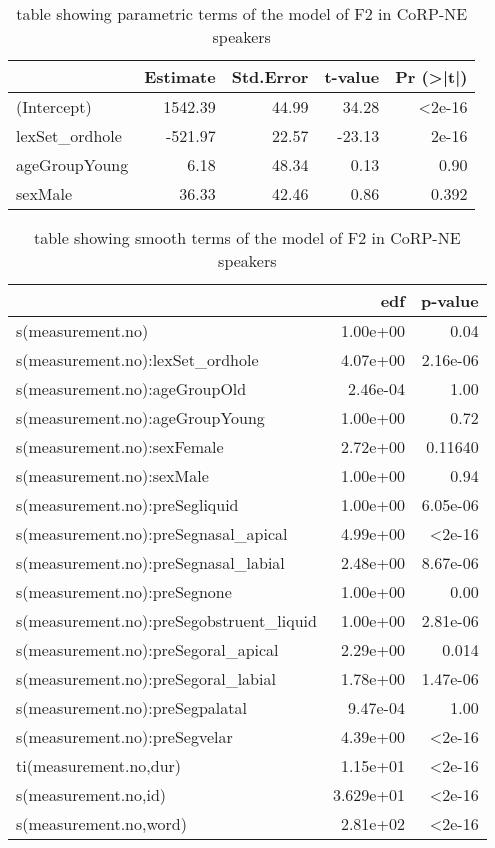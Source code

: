 \documentclass[../../../00.FullDoc/tex/Thesis]{subfiles}
\begin{document}
\begin{table}[htbp]
	\centering
	\begin{tabular}{lrrrr}
		\hline
		& Estimate & Std.Error & t-value & Pr (>|t|) \\
		\hline
		(Intercept) & 1542.39 & 44.99 & 34.28 & <2e-16 \\
		lexSet\_ordhole & -521.97 & 22.57 & -23.13 & 2e-16 \\
		ageGroupYoung & 6.18 & 48.34 & 0.13 & 0.90 \\
		sexMale & 36.33 & 42.46 & 0.86 & 0.392 \\
		\hline
	\end{tabular}%
	\caption{table showing parametric terms of the model of F2 in CoRP-NE speakers}
	\label{tbl:GGF2NE-para}%
\end{table}%


\begin{table}[htbp]
	\centering
	\begin{tabular}{lrr}
		\hline
		& edf & p-value \\
		\hline
		s(measurement.no) & 1.00e+00 & 0.04 \\
		s(measurement.no):lexSet\_ordhole & 4.07e+00 & 2.16e-06 \\
		s(measurement.no):ageGroupOld & 2.46e-04 & 1.00 \\
		s(measurement.no):ageGroupYoung & 1.00e+00 & 0.72 \\
		s(measurement.no):sexFemale & 2.72e+00 & 0.11640 \\
		s(measurement.no):sexMale & 1.00e+00 & 0.94 \\
		s(measurement.no):preSegliquid & 1.00e+00 & 6.05e-06 \\
		s(measurement.no):preSegnasal\_apical & 4.99e+00 & <2e-16 \\
		s(measurement.no):preSegnasal\_labial & 2.48e+00 & 8.67e-06 \\
		s(measurement.no):preSegnone & 1.00e+00 & 0.00 \\
		s(measurement.no):preSegobstruent\_liquid & 1.00e+00 & 2.81e-06 \\
		s(measurement.no):preSegoral\_apical & 2.29e+00 & 0.014 \\
		s(measurement.no):preSegoral\_labial & 1.78e+00 & 1.47e-06 \\
		s(measurement.no):preSegpalatal & 9.47e-04 & 1.00 \\
		s(measurement.no):preSegvelar & 4.39e+00 & <2e-16 \\
		ti(measurement.no,dur) & 1.15e+01 & <2e-16 \\
		s(measurement.no,id) & 3.629e+01 & <2e-16 \\
		s(measurement.no,word) & 2.81e+02 & <2e-16 \\
		\hline
	\end{tabular}
	\caption{table showing smooth terms of the model of F2 in CoRP-NE speakers}
	\label{tbl:GGF2NE-smooth}
\end{table}
\end{document}
